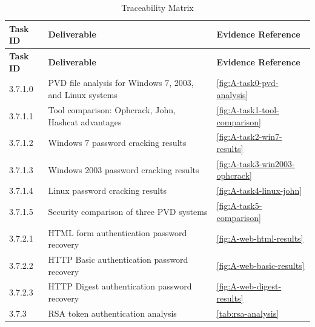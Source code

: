 {\small
\begin{longtable}{@{}p{1.8cm}p{9.8cm}p{3.2cm}@{}}
\caption{Traceability Matrix}\label{tab:traceability}\\
\toprule
\textbf{Task ID} & \textbf{Deliverable} & \textbf{Evidence Reference} \\
\midrule
\endfirsthead
\toprule
\textbf{Task ID} & \textbf{Deliverable} & \textbf{Evidence Reference} \\
\midrule
\endhead
3.7.1.0 & PVD file analysis for Windows 7, 2003, and Linux systems & \ref{fig:A-task0-pvd-analysis} \\
3.7.1.1 & Tool comparison: Ophcrack, John, Hashcat advantages & \ref{fig:A-task1-tool-comparison} \\
3.7.1.2 & Windows 7 password cracking results & \ref{fig:A-task2-win7-results} \\
3.7.1.3 & Windows 2003 password cracking results & \ref{fig:A-task3-win2003-ophcrack} \\
3.7.1.4 & Linux password cracking results & \ref{fig:A-task4-linux-john} \\
3.7.1.5 & Security comparison of three PVD systems & \ref{fig:A-task5-comparison} \\
3.7.2.1 & HTML form authentication password recovery & \ref{fig:A-web-html-results} \\
3.7.2.2 & HTTP Basic authentication password recovery & \ref{fig:A-web-basic-results} \\
3.7.2.3 & HTTP Digest authentication password recovery & \ref{fig:A-web-digest-results} \\
3.7.3 & RSA token authentication analysis & \ref{tab:rsa-analysis} \\
\bottomrule
\end{longtable}
}